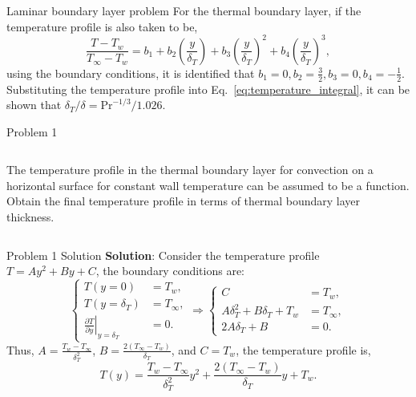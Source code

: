 \documentclass[9pt, aspectratio=169, handout]{beamer}
\begin{document}
\begin{frame}[allowframebreaks]{Laminar boundary layer problem}
    For the thermal boundary layer, if the temperature profile is also taken to be,
    \begin{equation}
        \frac{T - T_w}{T_\infty - T_w} = b_1 + b_2\left(\frac{y}{\delta_T}\right) + b_3\left(\frac{y}{\delta_T}\right)^2 + b_4\left(\frac{y}{\delta_T}\right)^3,
    \end{equation}
    using the boundary conditions, it is identified that $b_1=0, b_2=\frac{3}{2}, b_3=0, b_4=-\frac{1}{2}$. Substituting the temperature profile into Eq.~\eqref{eq:temperature_integral}, it can be shown that $\delta_T/\delta = \mathrm{Pr}^{-1/3}/1.026$.
\end{frame}

\begin{frame}{Problem 1}
    \begin{columns}
        The temperature profile in the thermal boundary layer for convection on a horizontal surface for constant wall temperature can be assumed to be a  function. Obtain the final temperature profile in terms of thermal boundary layer thickness.
    \end{columns}
\end{frame}

\begin{frame}{Problem 1 Solution}
    \textbf{Solution}: Consider the temperature profile $T=Ay^2 + By + C$, the boundary conditions are:
    \begin{equation}
        \left\lbrace
        \begin{aligned}
            T(y=0) &= T_w, \\
            T(y=\delta_T) &= T_\infty, \\
            \left.\frac{\partial T}{\partial y}\right|_{y=\delta_T} &= 0.
        \end{aligned}
        \right. \Rightarrow
        \left\lbrace
        \begin{aligned}
            C &= T_w, \\
            A\delta_T^2 + B\delta_T + T_w &= T_\infty, \\
            2A\delta_T + B &= 0.
        \end{aligned}
        \right.
    \end{equation}
    Thus, $A=\frac{T_w - T_{\infty}}{\delta_T^2}$, $B=\frac{2(T_{\infty}-T_w)}{\delta_T}$, and $C=T_w$, the temperature profile is,
    \begin{equation}
        T(y) = \frac{T_w - T_{\infty}}{\delta_T^2}y^2 + \frac{2(T_{\infty}-T_w)}{\delta_T}y + T_w.
    \end{equation}
\end{frame}
\end{document}
